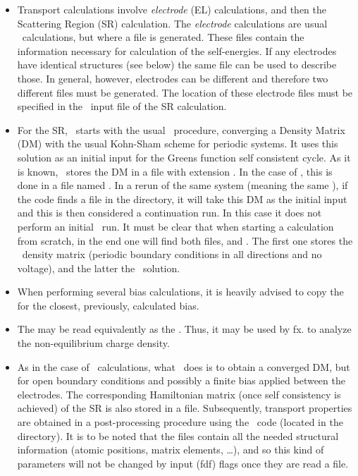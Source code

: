 \begin{itemize}
  \item%
  Transport calculations involve \emph{electrode} (EL) calculations,
  and then the Scattering Region (SR) calculation.  The
  \emph{electrode} calculations are usual \siesta\ calculations, but
  where a file  is generated. These files contain the
  information necessary for calculation of the self-energies. If any
  electrodes have identical structures (see below) the same
   file can be used to describe those. In general,
  however, electrodes can be different and therefore two different
   files must be generated. The location of these
  electrode files must be specified in the \fdflib\ input file of the SR
  calculation.

  \item %
  For the SR, \tsiesta\ starts with the usual \siesta\ procedure,
  converging a Density Matrix (DM) with the usual Kohn-Sham scheme for
  periodic systems. It uses this solution as an initial input for the
  Greens function self consistent cycle. As it is known, \siesta\
  stores the DM in a file with extension . In the case of
  \tsiesta, this is done in a file named . In a rerun of
  the same system (meaning the same \fdf{SystemLabel}), if the
  code finds a \sysfile{TSDE} file in the directory, it will take this
  DM as the initial input and this is then considered a continuation
  run. In this case it does not perform an initial \siesta\ run. It
  must be clear that when starting a calculation from scratch, in the
  end one will find both files, \sysfile{DM} and \sysfile{TSDE}.
  The first one stores the \siesta\ density matrix (periodic boundary
  conditions in all directions and no voltage), and the latter the
  \tsiesta\ solution. 

  \item %
  When performing several bias calculations, it is heavily advised to
  copy the \sysfile{TSDE} for the closest, previously, calculated
  bias.
  
  \item %
  The  may be read equivalently as the
  . Thus, it may be used by fx.  to
  analyze the non-equilibrium charge density.

  \item %
  As in the case of \siesta\ calculations, what \tsiesta\ does is to
  obtain a converged DM, but for open boundary conditions and possibly
  a finite bias applied between the electrodes. The corresponding
  Hamiltonian matrix (once self consistency is achieved) of the SR is
  also stored in a \sysfile{TSHS} file. Subsequently, transport
  properties are obtained in a post-processing procedure using the
  \tbtrans\ code (located in the \program{Util/TS/TBtrans}
  directory). It is to be noted that the  files contain
  all the needed structural information (atomic positions, matrix
  elements, \ldots), and so this kind of parameters will not be
  changed by input (fdf) flags once they are read a 
  file.


\end{itemize}
